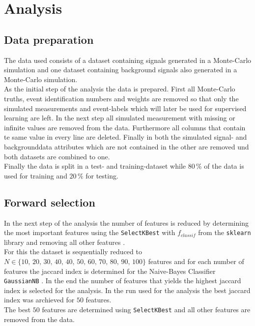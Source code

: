 \section{Analysis}\label{sec:Analysis}

\subsection{Data preparation}

The data used consists of a dataset containing signals generated in a Monte-Carlo simulation and one dataset containing
background signals also generated in a Monte-Carlo simulation. \\
As the initial step of the analysis the data is prepared.
First all Monte-Carlo truths, event identification numbers and weights are removed so that only the simulated measurements and
event-labels which will later be used for supervised learning are left. In the next step all simulated measurement with missing or
infinite values are removed from the data. Furthermore all columns that contain te same value in every line are deleted.
Finally in both the simulated signal- and backgrounddata attributes which are not contained in the other are removed und
both datasets are combined to one. \\
Finally the data is split in a test- and training-dataset while $80 \, \%$ of the data is used for training and $20 \,\%$
for testing.

\subsection{Forward selection}

In the next step of the analysis the number of features is reduced by determining the most important features using
the \texttt{SelectKBest} with \texttt{$f_{classif}$} from the \texttt{sklearn} library and removing all other features \cite{scikit-learn}. \\
For this the dataset is sequentially reduced to \\
$N \in \{ 10, \, 20, \, 30, \, 40, \, 40, \, 50, \, 60, \, 70, \, 80, \, 90, \, 100 \}$
features and for each number of features the jaccard index is determined for the Naive-Bayes Classifier \texttt{GaussianNB} \cite{scikit-learn}.
In the end the number of features that yields the highest jaccard index is selected for the analysis.
In the run used for the analysis the best jaccard index was archieved for $50$ features. \\
The best $50$ features are determined using \texttt{SelectKBest} and all other features are removed from the data.

